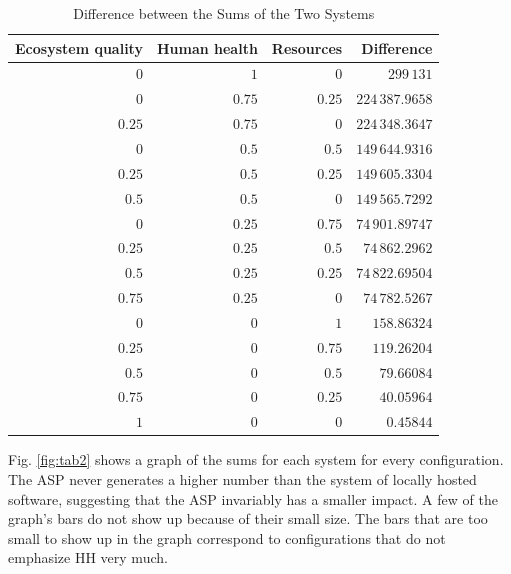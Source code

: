 \documentclass[final,journal,10pt,letterpaper,oneside,twocolumn,compsoc]%
{IEEEtran}
\begin{document}
\begin{table}[t!]
  \caption{Difference between the Sums of the Two Systems}
  \label{tab:15}
  \centering
    \begin{tabular}{| r | r | r | r |}
      \hline
      Ecosystem quality & Human health & Resources & Difference \\
      \hline
      $0$               & $1$          & $0$       & $299\,131$ \\
      $0$               & $0.75$       & $0.25$    & $224\,387.9658$ \\
      $0.25$            & $0.75$       & $0$       & $224\,348.3647$ \\
      $0$               & $0.5$        & $0.5$     & $149\,644.9316$ \\
      $0.25$            & $0.5$        & $0.25$    & $149\,605.3304$ \\
      $0.5$             & $0.5$        & $0$       & $149\,565.7292$ \\
      $0$               & $0.25$       & $0.75$    & $74\,901.89747$ \\
      $0.25$            & $0.25$       & $0.5$     & $74\,862.2962$ \\
      $0.5$             & $0.25$       & $0.25$    & $74\,822.69504$ \\
      $0.75$            & $0.25$       & $0$       & $74\,782.5267$ \\
      $0$               & $0$          & $1$       & $158.86324$ \\
      $0.25$            & $0$          & $0.75$    & $119.26204$ \\
      $0.5$             & $0$          & $0.5$     & $79.66084$ \\
      $0.75$            & $0$          & $0.25$    & $40.05964$ \\
      $1$               & $0$          & $0$       & $0.45844$ \\
      \hline
    \end{tabular}
\end{table}

Fig. \ref{fig:tab2} shows a graph of the sums for each system for every
configuration. The ASP never generates a higher number than the system of
locally hosted software, suggesting that the ASP
invariably has a smaller impact. A few of the graph's bars do not show up
because of their small size. The bars that are too small to show up in the graph
correspond to configurations that do not emphasize HH very much.
\end{document}
